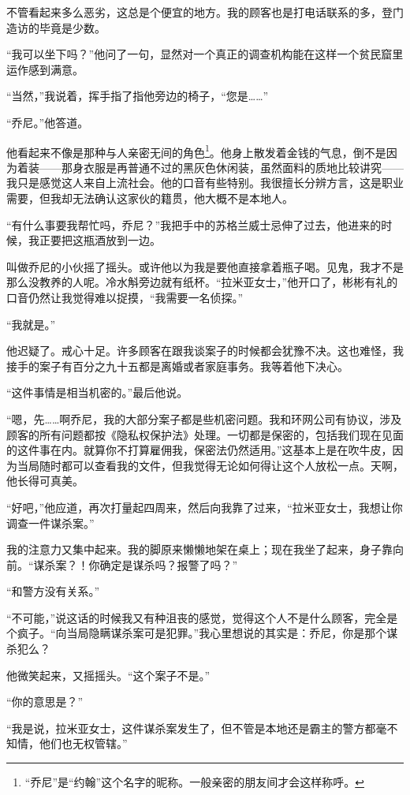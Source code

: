 \documentclass[AutoFakeBold=true]{book}
\begin{document}
不管看起来多么恶劣，这总是个便宜的地方。我的顾客也是打电话联系的多，登门造访的毕竟是少数。

``我可以坐下吗？''他问了一句，显然对一个真正的调查机构能在这样一个贫民窟里运作感到满意。

``当然，''我说着，挥手指了指他旁边的椅子，``您是……''

``乔尼。''他答道。

他看起来不像是那种与人亲密无间的角色\footnote{``乔尼''是``约翰''这个名字的昵称。一般亲密的朋友间才会这样称呼。}。他身上散发着{\kaishu 金钱}的气息，倒不是因为着装——那身衣服是再普通不过的黑灰色休闲装，虽然面料的质地比较讲究——我只是感觉这人来自上流社会。他的口音有些特别。我很擅长分辨方言，这是职业需要，但我却无法确认这家伙的籍贯，他大概不是本地人。

``有什么事要我帮忙吗，乔尼？''我把手中的苏格兰威士忌伸了过去，他进来的时候，我正要把这瓶酒放到一边。

叫做乔尼的小伙摇了摇头。或许他以为我是要他直接拿着瓶子喝。见鬼，我才不是那么没教养的人呢。冷水斛旁边就有纸杯。``拉米亚女士，''他开口了，彬彬有礼的口音仍然让我觉得难以捉摸，``我需要一名侦探。''

``我就是。''

他迟疑了。戒心十足。许多顾客在跟我谈案子的时候都会犹豫不决。这也难怪，我接手的案子有百分之九十五都是离婚或者家庭事务。我等着他下决心。

``这件事情是相当机密的。''最后他说。

``嗯，先……啊乔尼，我的大部分案子都是些机密问题。我和环网公司有协议，涉及顾客的所有问题都按《隐私权保护法》处理。{\kaishu 一切}都是保密的，包括我们现在见面的这件事在内。就算你不打算雇佣我，保密法仍然适用。''这基本上是在吹牛皮，因为当局随时都可以查看我的文件，但我觉得无论如何得让这个人放松一点。天啊，他长得可真美。

``好吧，''他应道，再次打量起四周来，然后向我靠了过来，``拉米亚女士，我想让你调查一件谋杀案。''

我的注意力又集中起来。我的脚原来懒懒地架在桌上；现在我坐了起来，身子靠向前。``{\kaishu 谋杀案}？！你确定是谋杀吗？报警了吗？''

``和警方没有关系。''

``不可能，''说这话的时候我又有种沮丧的感觉，觉得这个人不是什么顾客，完全是个疯子。``向当局隐瞒谋杀案可是犯罪。''我心里想说的其实是：{\kaishu 乔尼，你是那个谋杀犯么？}

他微笑起来，又摇摇头。``这个案子不是。''

``你的意思是？''

``我是说，拉米亚女士，这件谋杀案发生了，但不管是本地还是霸主的警方都毫不知情，他们也无权管辖。''
\end{document}
